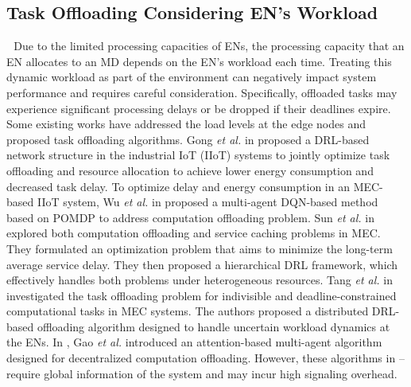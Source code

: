 \documentclass[12pt,draftclsnofoot,onecolumn]{IEEEtran}
\newenvironment{my}[2]%
{\begin{list}{}%
{\setlength{\rightmargin}{#1}\setlength{\leftmargin}{#2}}%


 \item[]{}

} {\end{list}}
\begin{document}
\begin{enumerate}
\begin{my}{1cm}{1cm}
{\subsection{Task Offloading Considering EN's Workload}
\,\,\,\,Due to the limited processing capacities of ENs, the processing capacity that an EN allocates to an MD depends on the EN's workload each time. Treating this dynamic workload as part of the environment can negatively impact system performance and requires careful consideration. Specifically, offloaded tasks may experience significant processing delays or be dropped if their deadlines expire. Some existing works have addressed the load levels at the edge nodes and proposed task offloading algorithms.
Gong \textit{et al.} in \cite{gong2022edge} proposed a DRL-based network structure in the industrial IoT (IIoT) systems to jointly optimize task offloading and resource allocation to achieve lower energy consumption and decreased task delay.
To optimize delay and energy consumption in an MEC-based IIoT system, Wu \textit{et al.} in \cite{wu2023multi} proposed a multi-agent DQN-based method based on POMDP to address computation offloading problem.
Sun \textit{et al.} in \cite{sun2024hierarchical} explored both computation offloading and service caching problems in MEC. They formulated an optimization problem that aims to minimize the long-term average service delay. They then proposed a hierarchical DRL framework, which effectively handles both problems under heterogeneous resources.
Tang \textit{et al.} in \cite{9253665} investigated the task offloading problem for indivisible and deadline-constrained computational tasks in MEC systems. The authors proposed a distributed DRL-based offloading algorithm designed to handle uncertain workload dynamics at the ENs. 
In \cite{gao2022large}, Gao \textit{et al.} introduced an attention-based multi-agent algorithm designed for decentralized computation offloading.
However, these algorithms in \cite{gong2022edge}–\cite{gao2022large} require global information of the system and may incur high signaling overhead.}
\end{my}

 
	
	

	
	
	
	
	
	




\end{enumerate}
\end{document}
